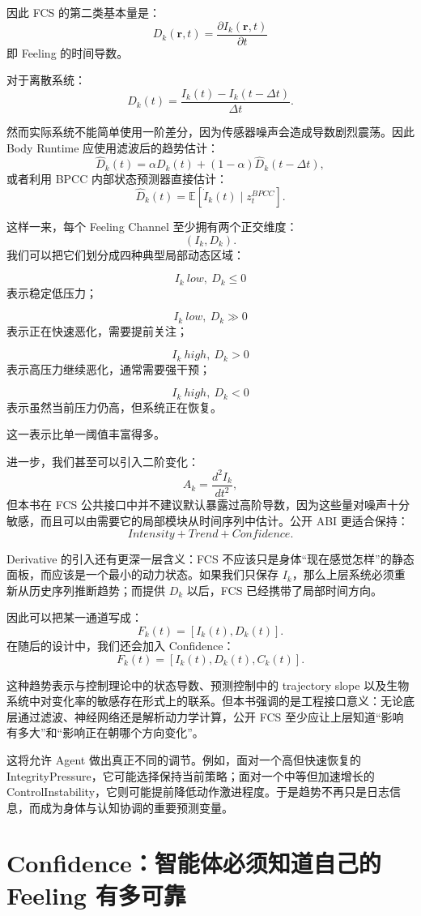 因此 FCS 的第二类基本量是：
\[
\boxed{
D_k(\mathbf r,t)
=
\frac{\partial I_k(\mathbf r,t)}{\partial t}
}
\]
即 Feeling 的时间导数。

对于离散系统：
\[
D_k(t)
=
\frac{
I_k(t)-I_k(t-\Delta t)
}{
\Delta t
}.
\]

然而实际系统不能简单使用一阶差分，因为传感器噪声会造成导数剧烈震荡。因此 Body Runtime 应使用滤波后的趋势估计：
\[
\hat D_k(t)
=
\alpha
D_k(t)
+
(1-\alpha)
\hat D_k(t-\Delta t),
\]
或者利用 BPCC 内部状态预测器直接估计：
\[
\hat D_k(t)
=
\mathbb E
\left[
\dot I_k(t)
\mid
z_t^{BPCC}
\right].
\]

这样一来，每个 Feeling Channel 至少拥有两个正交维度：
\[
(I_k,D_k).
\]
我们可以把它们划分成四种典型局部动态区域：

\[
I_k\ low,\ D_k\le0
\]
表示稳定低压力；

\[
I_k\ low,\ D_k\gg0
\]
表示正在快速恶化，需要提前关注；

\[
I_k\ high,\ D_k>0
\]
表示高压力继续恶化，通常需要强干预；

\[
I_k\ high,\ D_k<0
\]
表示虽然当前压力仍高，但系统正在恢复。

这一表示比单一阈值丰富得多。

进一步，我们甚至可以引入二阶变化：
\[
A_k
=
\frac{d^2 I_k}{dt^2},
\]
但本书在 FCS 公共接口中并不建议默认暴露过高阶导数，因为这些量对噪声十分敏感，而且可以由需要它的局部模块从时间序列中估计。公开 ABI 更适合保持：
\[
Intensity
+
Trend
+
Confidence.
\]

Derivative 的引入还有更深一层含义：FCS 不应该只是身体“现在感觉怎样”的静态面板，而应该是一个最小的动力状态。如果我们只保存 $I_k$，那么上层系统必须重新从历史序列推断趋势；而提供 $D_k$ 以后，FCS 已经携带了局部时间方向。

因此可以把某一通道写成：
\[
F_k(t)
=
\left[
I_k(t),
D_k(t)
\right].
\]
在随后的设计中，我们还会加入 Confidence：
\[
F_k(t)
=
\left[
I_k(t),
D_k(t),
C_k(t)
\right].
\]

这种趋势表示与控制理论中的状态导数、预测控制中的 trajectory slope 以及生物系统中对变化率的敏感存在形式上的联系。但本书强调的是工程接口意义：无论底层通过滤波、神经网络还是解析动力学计算，公开 FCS 至少应让上层知道“影响有多大”和“影响正在朝哪个方向变化”。

这将允许 Agent 做出真正不同的调节。例如，面对一个高但快速恢复的 IntegrityPressure，它可能选择保持当前策略；面对一个中等但加速增长的 ControlInstability，它则可能提前降低动作激进程度。于是趋势不再只是日志信息，而成为身体与认知协调的重要预测变量。

\section{Confidence：智能体必须知道自己的 Feeling 有多可靠}

